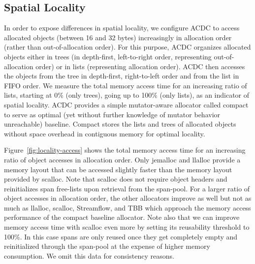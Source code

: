 \documentclass[10pt]{sigplanconf}
\begin{document}
\subsection{Spatial Locality}

In order to expose differences in spatial locality, we configure ACDC to access
allocated objects (between 16 and 32 bytes) increasingly in allocation order
(rather than out-of-allocation order). For this purpose, ACDC organizes
allocated objects either in trees (in depth-first, left-to-right order,
representing out-of-allocation order) or in lists (representing allocation
order). ACDC then accesses the objects from the tree in depth-first,
right-to-left order and from the list in FIFO order.  We measure the total
memory access time for an increasing ratio of lists, starting at 0\% (only
trees), going up to 100\% (only lists), as an indicator of spatial locality.
ACDC provides a simple mutator-aware allocator called compact to serve as
optimal (yet without further knowledge of mutator behavior unreachable)
baseline. Compact stores the lists and trees of allocated objects without space
overhead in contiguous memory for optimal locality.

Figure~\ref{fig:locality-access} shows the total memory access time for an
increasing ratio of object accesses in allocation order.  Only jemalloc and
llalloc provide a memory layout that can be accessed slightly  faster than the
memory layout provided by scalloc. Note that scalloc does not require object headers and
reinitializes span free-lists upon retrieval from the span-pool. For a larger
ratio of object accesses in allocation order, the other allocators improve as well but not as much as llalloc, scalloc, Streamflow, and TBB which approach the
memory access performance of the compact baseline allocator. Note also that we can
improve memory access time with scalloc even more by setting its reusability threshold to 100\%. In this case spans are only reused once they get completely empty and
reinitialized through the span-pool at the expense of higher memory consumption.
We omit this data for consistency reasons.
\end{document}
